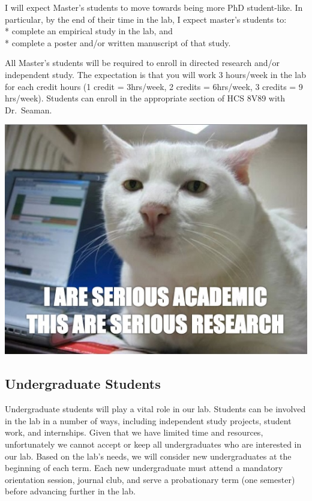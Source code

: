 \documentclass[
]{book}
\begin{document}
I will expect Master's students to move towards being more PhD student-like. In particular, by the end of their time in the lab, I expect master's students to:\\
* complete an empirical study in the lab, and\\
* complete a poster and/or written manuscript of that study.

All Master's students will be required to enroll in directed research and/or independent study. The expectation is that you will work 3 hours/week in the lab for each credit hours (1 credit = 3hrs/week, 2 credits = 6hrs/week, 3 credits = 9 hrs/week). Students can enroll in the appropriate section of HCS 8V89 with Dr.~Seaman.

\includegraphics{images/researchcat.jpg}

\hypertarget{undergraduate-students}{%
\subsection{Undergraduate Students}\label{undergraduate-students}}

Undergraduate students will play a vital role in our lab. Students can be involved in the lab in a number of ways, including independent study projects, student work, and internships. Given that we have limited time and resources, unfortunately we cannot accept or keep all undergraduates who are interested in our lab. Based on the lab's needs, we will consider new undergraduates at the beginning of each term. Each new undergraduate must attend a mandatory orientation session, journal club, and serve a probationary term (one semester) before advancing further in the lab.
\end{document}
